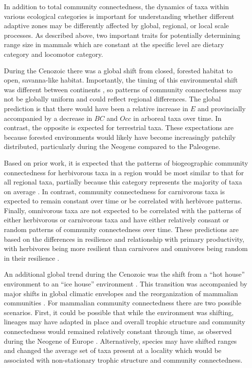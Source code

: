 \documentclass[12pt,letterpaper]{article}
\begin{document}
In addition to total community connectedness, the dynamics of taxa within various ecological categories is important for understanding whether different adaptive zones may be differently affected by global, regional, or local scale processes. As described above, two important traits for potentially determining range size in mammals which are constant at the specific level are dietary category and locomotor category. 

During the Cenozoic there was a global shift from closed, forested habitat to open, savanna-like habitat. Importantly, the timing of this environmental shift was different between continents \citep{Stromberg2005,Stromberg2013}, so patterns of community connectedness may not be globally uniform and could reflect regional differences. The global prediction is that there would have been a relative increase in \(E\) and provincially accompanied by a decrease in \(BC\) and \(Occ\) in arboreal taxa over time. In contrast, the opposite is expected for terrestrial taxa. These expectations are because forested environments would likely have become increasingly patchily distributed, particularly during the Neogene compared to the Paleogene.

Based on prior work, it is expected that the patterns of biogeographic community connectedness for herbivorous taxa in a region would be most similar to that for all regional taxa, partially because this category represents the majority of taxa on average \citep{Jernvall2002}. In contrast, community connectedness for carnivorous taxa is expected to remain constant over time or be correlated with herbivore patterns. Finally, omnivorous taxa are not expected to be correlated with the patterns of either herbivorous or carnivorous taxa and have either relatively consant or random patterns of community connectedness over time.  These predictions are based on the differences in resilience and relationship with primary productivity, with herbivores being more resilient than carnivores and omnivores being random in their resilience \citep{Jernvall2004}. 

An additional global trend during the Cenozoic was the shift from a ``hot house'' environment to an ``ice house'' environment \citep{Zachos2008,Zachos2001}. This transition was accompanied by major shifts in global climatic envelopes and the reorganization of mammalian communities \citep{Janis1993a,Fortelius2002,Blois2009,Alroy2000g,Figueirido2012}. For mammalian community connectedness there are two possible scenarios. First, it could be possible that while the environment was shifting, lineages may have adapted in place and overall trophic structure and community connectedness would remained relatively constant through time, as observed during the Neogene of Europe \citep{Jernvall2004}. Alternatively, species may have shifted ranges and changed the average set of taxa present at a locality which would be associated with non-stationary trophic structure and community connectedness.
\end{document}
